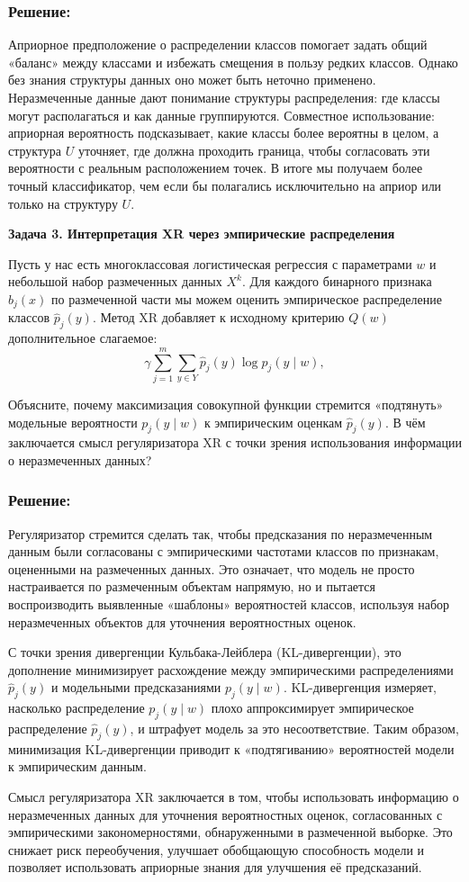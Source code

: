 \subsubsection*{Решение:}
Априорное предположение о распределении классов помогает задать общий «баланс» между классами и избежать смещения в пользу редких классов. Однако без знания структуры данных оно может быть неточно применено. Неразмеченные данные дают понимание структуры распределения: где классы могут располагаться и как данные группируются. Совместное использование: априорная вероятность подсказывает, какие классы более вероятны в целом, а структура $U$ уточняет, где должна проходить граница, чтобы согласовать эти вероятности с реальным расположением точек. В итоге мы получаем более точный классификатор, чем если бы полагались исключительно на априор или только на структуру $U$.

\bigskip

\noindent\textbf{Задача 3. Интерпретация XR через эмпирические распределения}

Пусть у нас есть многоклассовая логистическая регрессия с параметрами $w$ и небольшой набор размеченных данных $X^k$. Для каждого бинарного признака $b_j(x)$ по размеченной части мы можем оценить эмпирическое распределение классов $\hat{p}_j(y)$. Метод XR добавляет к исходному критерию $Q(w)$ дополнительное слагаемое:
\[
\gamma \sum_{j=1}^m \sum_{y \in Y} \hat{p}_j(y) \log p_j(y \mid w),
\]

Объясните, почему максимизация совокупной функции стремится «подтянуть» модельные вероятности $p_j(y \mid w)$ к эмпирическим оценкам $\hat{p}_j(y)$. В чём заключается смысл регуляризатора XR с точки зрения использования информации о неразмеченных данных?

\subsubsection*{Решение:} 
Регуляризатор стремится сделать так, чтобы предсказания по неразмеченным данным были согласованы с эмпирическими частотами классов по признакам, оцененными на размеченных данных. Это означает, что модель не просто настраивается по размеченным объектам напрямую, но и пытается воспроизводить выявленные «шаблоны» вероятностей классов, используя набор неразмеченных объектов для уточнения вероятностных оценок. 

С точки зрения дивергенции Кульбака-Лейблера (KL-дивергенции), это дополнение минимизирует расхождение между эмпирическими распределениями $\hat{p}_j(y)$ и модельными предсказаниями $p_j(y \mid w)$. KL-дивергенция измеряет, насколько распределение $p_j(y \mid w)$ плохо аппроксимирует эмпирическое распределение $\hat{p}_j(y)$, и штрафует модель за это несоответствие. Таким образом, минимизация KL-дивергенции приводит к «подтягиванию» вероятностей модели к эмпирическим данным.

Смысл регуляризатора XR заключается в том, чтобы использовать информацию о неразмеченных данных для уточнения вероятностных оценок, согласованных с эмпирическими закономерностями, обнаруженными в размеченной выборке. Это снижает риск переобучения, улучшает обобщающую способность модели и позволяет использовать априорные знания для улучшения её предсказаний.


